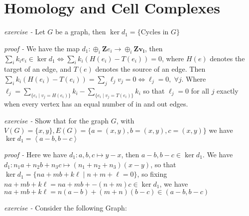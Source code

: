 \documentclass[11pt]{article}
\theoremstyle{definition}
\newcommand{\set}[1]{\{#1\}}
\newcommand{\gen}[1]{\left\langle #1 \right\rangle}
\begin{document}
\section{Homology and Cell Complexes}

\emph{exercise - }\label{HEx1} Let \(G\) be a graph, then \(\ker d_1 = \set{\text{Cycles in }G}\)

\emph{proof - } We have the map \(d_1: \oplus_i \mathbf{Z}e_i \to \oplus_i \mathbf{Zv_i}\), then \(\sum_i k_i e_i \in \ker d_1 \iff \sum_i k_i (H(e_i) - T(e_i)) = 0\), where \(H(e)\) denotes the target of an edge, and \(T(e)\) denotes the source of an edge. Then \(\sum_i k_i (H(e_i) - T(e_i)) = \sum_j\ell_j v_j = 0 \iff \ell_j = 0,\; \forall j\). Where \(\ell_j = \sum_{\set{e_i \mid v_j = H(e_i)}} k_i - \sum_{\set{e_i \mid v_j = T(e_i)}} k_i\) so that \(\ell_j = 0\) for all \(j\) exactly when every vertex has an equal number of in and out edges.


\emph{exercise - }\label{HEx2} Show that for the graph \(G\), with \(V(G) = \set{x,y}, E(G) = \set{a = (x,y),b = (x,y), c = (x,y)}\) we have \(\ker d_1 = \gen{a-b, b-c}\)

\emph{proof - } Here we have \(d_1: a,b,c \mapsto y-x\), then \(a-b, b-c \in \ker d_1\). We have \(d_1: n_1a + n_2b + n_3c \mapsto (n_1 + n_2 + n_3)(x-y)\), so that \(\ker d_1 = \set{na + mb + k\ell \mid n + m + \ell = 0}\), so fixing \(na + mb + k\ell = na + mb + -(n+m)c \in \ker d_1\), we have \(na + mb + k\ell = n(a-b) + (m+n)(b-c) \in (a-b,b-c)\)


\emph{exercise - }\label{HEx3} Consider the following Graph:
\end{document}

